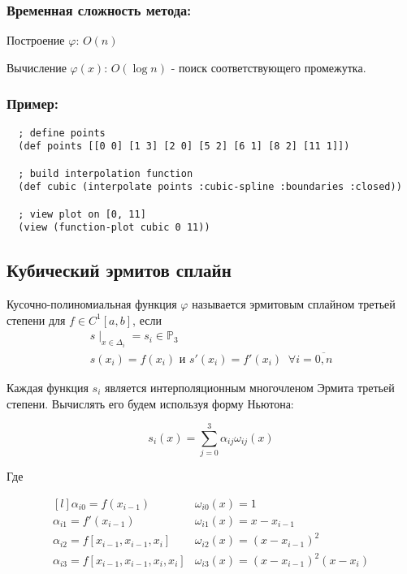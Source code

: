 \subsubsection{Временная сложность метода:}

Построение $\varphi$: $O(n)$

Вычисление $\varphi(x)$: $O(\log n)$ - поиск соответствующего промежутка.

\subsubsection{Пример:}

\begin{verbatim}
  ; define points
  (def points [[0 0] [1 3] [2 0] [5 2] [6 1] [8 2] [11 1]])

  ; build interpolation function
  (def cubic (interpolate points :cubic-spline :boundaries :closed))

  ; view plot on [0, 11]
  (view (function-plot cubic 0 11))
\end{verbatim}



\subsection{Кубический эрмитов сплайн}

Кусочно-полиномиальная функция $\varphi$ называется эрмитовым сплайном третьей степени для $f \in C^1[a, b]$, если
\begin{equation}
  \begin{gathered}
    s\mid_{x\in \Delta_i} = s_i \in \mathbb{P}_3 \\
      s(x_i) = f(x_i) \text{ и } s'(x_i) = f'(x_i) \;\; \forall i = \overline{0,n}
  \end{gathered}
\end{equation}

Каждая функция $s_i$ является интерполяционным многочленом Эрмита третьей степени. Вычислять его будем используя форму Ньютона:

\begin{equation}
  s_i(x) = \sum_{j=0}^3 \alpha_{ij} \omega_{ij}(x)
\end{equation}

\noindent Где

\begin{equation}
  \begin{matrix*}[l]
    \alpha_{i0} = f(x_{i-1}) & \omega_{i0}(x) = 1\\
    \alpha_{i1} = f'(x_{i-1}) & \omega_{i1}(x) = x - x_{i-1} \\
    \alpha_{i2} = f[x_{i-1}, x_{i-1}, x_i] & \omega_{i2}(x) = (x - x_{i-1})^2 \\
    \alpha_{i3} = f[x_{i-1}, x_{i-1}, x_i, x_i] & \omega_{i3}(x) =  (x - x_{i-1})^2(x-x_i)
  \end{matrix*}
\end{equation}

